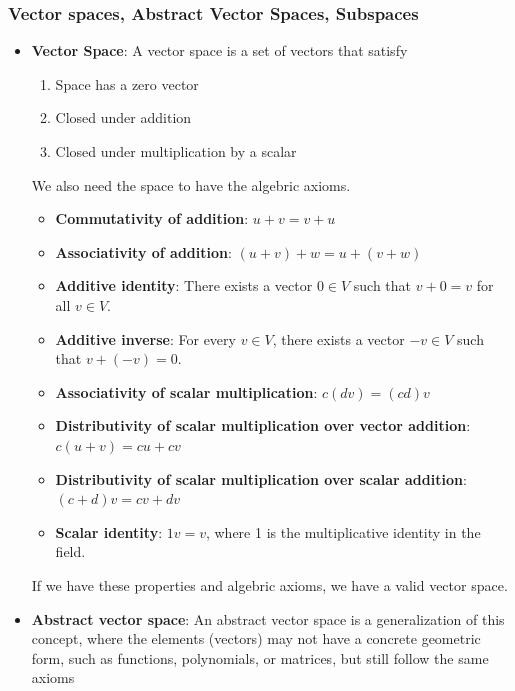 \documentclass{report}
\begin{document}
    \subsubsection{Vector spaces, Abstract Vector Spaces, Subspaces}
    \begin{itemize}
        \item \textbf{Vector Space}: A vector space is a set of vectors that satisfy
            \begin{enumerate}
                \item Space has a zero vector
                \item Closed under addition
                \item Closed under multiplication by a scalar
            \end{enumerate}
            \bigbreak \noindent 
            We also need the space to have the algebric axioms.
            \begin{itemize}
                \item \textbf{Commutativity of addition}: \( u + v = v + u \)
                \item \textbf{Associativity of addition}: \( (u + v) + w = u + (v + w) \)
                \item \textbf{Additive identity}: There exists a vector \( 0 \in V \) such that \( v + 0 = v \) for all \( v \in V \).
                \item \textbf{Additive inverse}: For every \( v \in V \), there exists a vector \( -v \in V \) such that \( v + (-v) = 0 \).
                \item \textbf{Associativity of scalar multiplication}: \( c(dv) = (cd)v \)
                \item \textbf{Distributivity of scalar multiplication over vector addition}: \( c(u + v) = cu + cv \)
                \item \textbf{Distributivity of scalar multiplication over scalar addition}: \( (c + d)v = cv + dv \)
                \item \textbf{Scalar identity}: \( 1v = v \), where 1 is the multiplicative identity in the field.
            \end{itemize}
            \bigbreak \noindent 
            If we have these properties and algebric axioms, we have a valid vector space.
        \item \textbf{Abstract vector space}: An abstract vector space is a generalization of this concept, where the elements (vectors) may not have a concrete geometric form, such as functions, polynomials, or matrices, but still follow the same axioms

\end{itemize}
\end{document}
